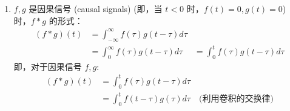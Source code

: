 \documentclass[linespread=1.5,openany]{book}%
\def\diff{d}%
\theoremstyle{plain}
\newcommand{\diff}{\mathop{}\!\mathrm{d}}  %
\begin{document}
{{{{{{								\begin{enumerate}[label=(\arabic*)] %
									\item $f, g$ 是因果信号 (causal signals) (即，当 $t<0$ 时，$f(t)=0, g(t)=0$) 时，$f*g$ 的形式：
									\begin{align*}
										(f*g)(t) &= \int_{-\infty}^{\infty} f(\tau)g(t-\tau) \diff \tau \\
										&= \int_{0}^{\infty} f(\tau)g(t-\tau) \diff \tau 
										&= \int_{0}^{t} f(\tau)g(t-\tau) \diff \tau 
									\end{align*}
									即，对于因果信号 $f, g$:
									\begin{align}
										(f*g)(t) &= \int_{0}^{t} f(\tau)g(t-\tau) \diff \tau \label{eq:L15_conv_causal_form1} \\
										&= \int_{0}^{t} f(t-\tau)g(\tau) \diff \tau \quad \text{(利用卷积的交换律)} \label{eq:L15_conv_causal_form2}
									\end{align}
									

\end{enumerate}}}}}}}
\end{document}
